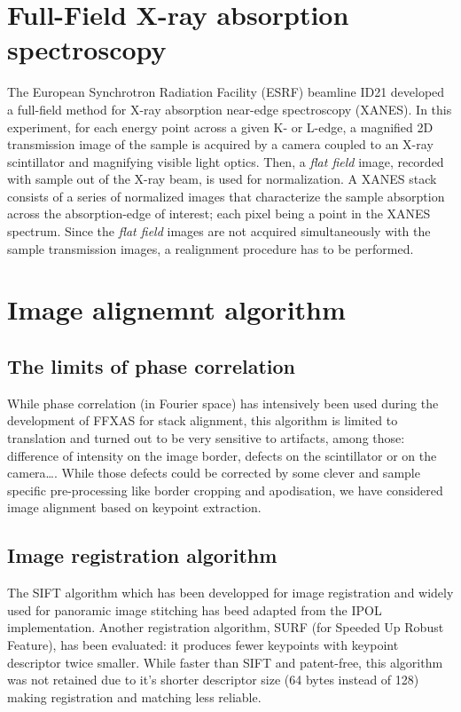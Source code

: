 \documentclass[preprint]{iucr}
\begin{document}
\section{Full-Field X-ray absorption spectroscopy}
The European Synchrotron Radiation Facility (ESRF) beamline ID21 developed a
full-field method for X-ray absorption near-edge spectroscopy\cite{fullfield}
(XANES). 
In this experiment, for each energy point across a given K- or L-edge,
a magnified 2D transmission image of the sample is acquired by a camera coupled
to an X-ray scintillator and magnifying visible light optics.
Then, a \emph{flat field} image, recorded with sample out of the X-ray beam, is
used for normalization.
A XANES stack consists of a series of normalized images that characterize the
sample absorption across the absorption-edge of interest; each pixel being a
point in the XANES spectrum.
Since the \emph{flat field} images are not acquired simultaneously with the
sample transmission images, a realignment procedure has to be performed.


\section{Image alignemnt algorithm}

\subsection{The limits of phase correlation}

While phase correlation (in Fourier space) has intensively been used during the
development of FFXAS for stack alignment, this algorithm is limited to
translation and turned out to be very sensitive to artifacts, among those:
difference of intensity on  the image border, defects on the scintillator or on
the camera\ldots.
While those defects could be corrected by some clever and sample
specific pre-processing like border cropping and apodisation, we have considered
image alignment based on keypoint extraction.

\subsection{Image registration algorithm}

The SIFT algorithm \cite{Lowe99,Lowe04} which has been developped
for image registration and widely used for panoramic image stitching has beed
adapted from the IPOL\cite{ASIFT} implementation.
Another registration algorithm, SURF (for Speeded Up Robust Feature\cite{surf}),
has been evaluated: it produces fewer keypoints with keypoint descriptor twice
smaller. 
While faster than SIFT and patent-free, this algorithm was not
retained due to it's shorter descriptor size (64 bytes instead of 128) making 
registration and matching less reliable.
\end{document}
